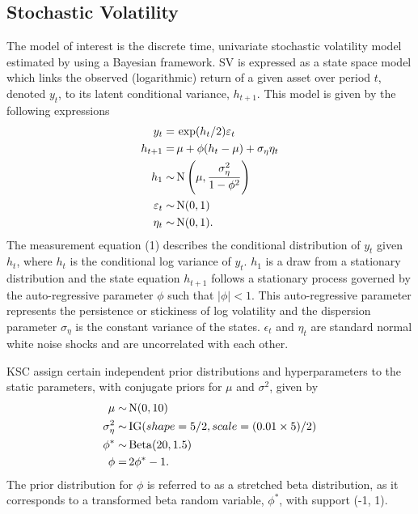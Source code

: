 \documentclass[12pt, a4paper]{article}
\begin{document}
\subsection{Stochastic Volatility}
    The model of interest is the discrete time, univariate stochastic volatility model estimated by \citet{kim1998stochastic} using a Bayesian framework. SV is expressed as a state space model which links the observed (logarithmic) return of a given asset over period $t$, denoted $y_t$, to its latent conditional variance, $h_{t+1}$. This model is given by the following expressions
    \begin{align}
    y_t =& \space \,\exp(h_t/2) \varepsilon_t \\
    h_{t+1} =& \space \, \mu +\phi(h_t - \mu) + \sigma_{\eta} \eta_t  \\
    h_1 \sim& \space \,\mathrm{N}\left(\mu, \frac{\sigma_{\eta}^2}{1-\phi^2}\right) \\
    \varepsilon_t \sim& \space \,\mathrm{N}(0,1) \\
    \eta_t \sim& \space \,\mathrm{N}(0,1).
    \end{align}
    The measurement equation (1) describes the conditional distribution of $y_t$ given $h_t$, where $h_t$ is the conditional log variance of $y_t$. $h_1$ is a draw from a stationary distribution and the state equation $h_{t+1}$ follows a stationary process governed by the auto-regressive parameter $\phi$ such that $|\phi|<1$. This auto-regressive parameter represents the persistence or stickiness of log volatility and the dispersion parameter $\sigma_{\eta}$ is the constant variance of the states. $\epsilon_t$ and $\eta_t$ are standard normal white noise shocks and are uncorrelated with each other.

    KSC assign certain independent prior distributions and hyperparameters to the static parameters, with conjugate priors for $\mu$ and $\sigma^2$, given by
    \begin{align}
    \mu \sim& \space \,\mathrm{N}(0, 10) \\
    \sigma_{\eta}^2 \sim& \space \, \mathrm{IG}(shape=5/2, scale=(0.01\times 5) / 2) \\
    \phi^{\ast} \sim& \space \,\mathrm{Beta}(20, 1.5) \\
    \phi =& \space \, 2\phi^{\ast} - 1.
    \end{align}
    The prior distribution for $\phi$ is referred to as a stretched beta distribution, as it corresponds to a transformed beta random variable, $\phi^*$, with support (-1, 1).
    
\end{document}
